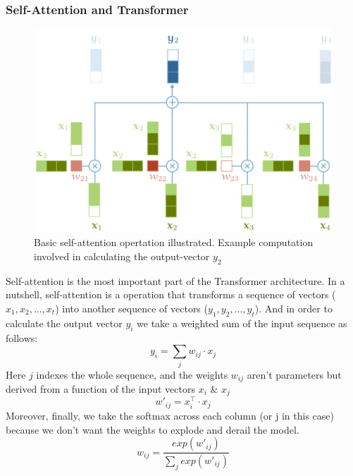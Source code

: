 \documentclass[12pt,a4paper,twoside,openright]{report}
\begin{document}
\subsubsection{Self-Attention and Transformer}
\begin{figure}
    \centering
    \includegraphics[width=\textwidth*3/4]{figs/self-attentoin-copied.PNG}
    \caption{Basic self-attention opertation illustrated. Example computation involved in calculating the output-vector $y_2$}
    \label{fig:basic-self-attention}
\end{figure}

Self-attention is the most important part of the Transformer architecture. In a nutshell, self-attention is a operation that transforms a sequence of vectors ($x_1, x_2, ... , x_t$) into another sequence of vectors ($y_1, y_2, ... , y_t$). And in order to calculate the output vector $y_i$ we take a weighted sum of the input sequence as follows: 
\[ y_i = \sum_j w_{ij} \cdot x_j \]
Here $j$ indexes the whole sequence, and the weights $w_{ij}$ aren't parameters but derived from a function of the input vectors $x_i$ \& $x_j$ 
\[ w'_{ij} = x_i^{\top} \cdot x_j \]
Moreover, finally, we take the softmax across each column (or j in this case) because we don't want the weights to explode and derail the model.
\[ w_{ij} = \frac{exp(w'_{ij})}{\sum_j exp(w'_{ij})} \]
\end{document}
